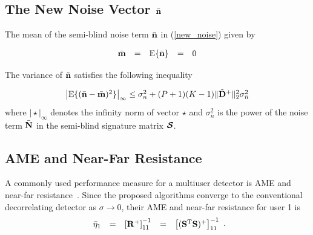 \documentclass[a4paper,10pt,fleqn, twocolumn]{IEEETran}
\newcommand{\bm}{{\bf m}}
\newcommand{\bn}{{\bf n}}
\newcommand{\bN}{{\bf N}}
\newcommand{\bS}{{\bf S}}
\newcommand{\bD}{{\bf D}}
\newcommand{\bR}{{\bf R}}
\newcommand{\bcS}{{\mbox {\boldmath ${\cal S}$}}}
\begin{document}
\subsection{The New Noise Vector $\bar{\bn}$}
The mean of the semi-blind noise term $\bar{\bn}$ in
(\ref{new_noise}) given by

\begin{equation}
\begin{array}{rcccl}
\bar{\bm}&=&{\rm E}\{\bar{\bn}\}&=&0
\end{array}
\end{equation}

\noindent The variance of $\tilde{\bn}$ satisfies the following
inequality

\begin{equation}\hspace{-0.0in}
\begin{array}{l}
\bigl|{\rm
E}\{(\bar{\bn}-\bar{\bm})^2\}\bigr|_{\infty}\leq\sigma_n^2+(P+1)(K-1)\|\tilde{\bD}^+\|_2^2\sigma_{\bar{n}}^2
\end{array} \label{noise_mean}
\end{equation}
\noindent where $\bigl|\star\bigr|_{\infty}$ denotes the infinity
norm of vector $\star$ and $\sigma_{\bar{n}}^2$ is the power of
the noise term $\bar{\bN}$ in the semi-blind signature matrix
$\bcS$.
\subsection{AME and Near-Far Resistance}
A commonly used performance measure for a multiuser detector is
AME and near-far resistance~\cite{Verd98}. Since the proposed
algorithms converge to the conventional decorrelating detector as
$\sigma\rightarrow 0$, their AME and near-far resistance for user
1 is
\begin{equation}
\begin{array}{rcccl}
\bar{\eta}_1&=&\left[\bR^{+}\right]_{11}^{-1}&=&\left[(\bS^{\rm
T}\bS)^{+}\right]_{11}^{-1}
\end{array}.
\end{equation}
\end{document}
